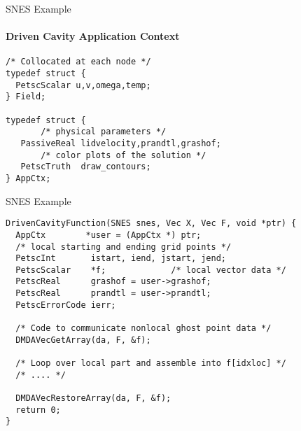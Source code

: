 
\begin{frame}[fragile]{SNES Example}
\framesubtitle{Driven Cavity Application Context}
\begin{verbatim}
/* Collocated at each node */
typedef struct {
  PetscScalar u,v,omega,temp;
} Field;

typedef struct {
       /* physical parameters */
   PassiveReal lidvelocity,prandtl,grashof;
       /* color plots of the solution */
   PetscTruth  draw_contours;
} AppCtx;
\end{verbatim}
\end{frame}

\begin{frame}[fragile]{SNES Example}
\begin{verbatim}
DrivenCavityFunction(SNES snes, Vec X, Vec F, void *ptr) {
  AppCtx        *user = (AppCtx *) ptr;
  /* local starting and ending grid points */
  PetscInt       istart, iend, jstart, jend;
  PetscScalar    *f;             /* local vector data */
  PetscReal      grashof = user->grashof;  
  PetscReal      prandtl = user->prandtl;
  PetscErrorCode ierr;

  /* Code to communicate nonlocal ghost point data */
  DMDAVecGetArray(da, F, &f);

  /* Loop over local part and assemble into f[idxloc] */
  /* .... */

  DMDAVecRestoreArray(da, F, &f);
  return 0;
}
\end{verbatim}
\end{frame}

